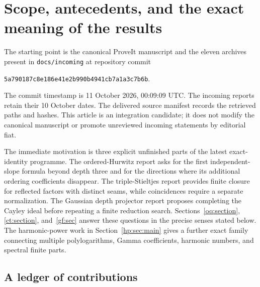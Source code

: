 \documentclass[11pt,a4paper]{article}
\numberwithin{equation}{section}
\theoremstyle{definition}
\theoremstyle{remark}
\newcommand{\src}[1]{\nolinkurl{#1}}
\begin{document}

\clearpage
{\small\tableofcontents}
\clearpage

\section{Scope, antecedents, and the exact meaning of the results}
\label{scope:section}

The starting point is the canonical ProveIt manuscript
\cite{RepoMain} and the eleven archives present in \src{docs/incoming}
at repository commit
\begin{center}
\texttt{5a790187c8e186e41e2b990b4941cb7a1a3c7b6b}.
\end{center}
The commit timestamp is 11 October 2026, 00:09:09 UTC. The incoming
reports retain their 10 October dates. The delivered source manifest
records the retrieved paths and hashes. This article is an integration
candidate; it does not modify the canonical manuscript or promote
unreviewed incoming statements by editorial fiat.

The immediate motivation is three explicit unfinished parts of the
latest exact-identity programme. The ordered-Hurwitz report
\cite{RepoOrdered} asks for the first independent-slope formula beyond
depth three and for the directions where its additional ordering
coefficients disappear. The triple-Stieltjes report \cite{RepoTriple}
provides finite closure for reflected factors with distinct seams, while
coincidences require a separate normalization. The Gaussian depth
projector report \cite{gf:Depth} proposes completing the Cayley ideal
before repeating a finite reduction search. Sections~\ref{oq:section},
\ref{ct:section}, and~\ref{gf:sec} answer these questions in the
precise senses stated below. The harmonic-power work in
Section~\ref{hp:sec:main} gives a further exact family connecting
multiple polylogarithms, Gamma coefficients, harmonic numbers, and
spectral finite parts.

\subsection{A ledger of contributions}
\end{document}

